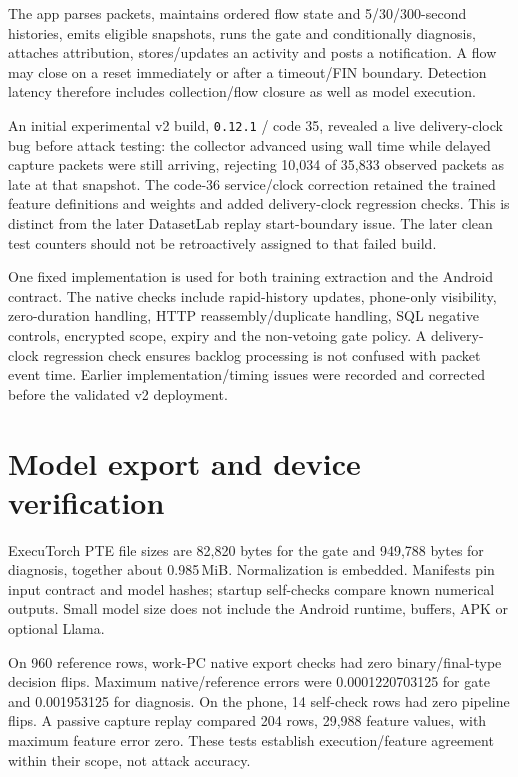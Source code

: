 \documentclass[11pt,a4paper,oneside]{report}
\newcommand{\code}[1]{\nolinkurl{#1}}
\begin{document}
The app parses packets, maintains ordered flow state and 5/30/300-second histories, emits eligible snapshots, runs the gate and conditionally diagnosis, attaches attribution, stores/updates an activity and posts a notification. A flow may close on a reset immediately or after a timeout/FIN boundary. Detection latency therefore includes collection/flow closure as well as model execution.

An initial experimental v2 build, \code{0.12.1} / code 35, revealed a live delivery-clock bug before attack testing: the collector advanced using wall time while delayed capture packets were still arriving, rejecting 10,034 of 35,833 observed packets as late at that snapshot. The code-36 service/clock correction retained the trained feature definitions and weights and added delivery-clock regression checks. This is distinct from the later DatasetLab replay start-boundary issue. The later clean test counters should not be retroactively assigned to that failed build.

One fixed implementation is used for both training extraction and the Android contract. The native checks include rapid-history updates, phone-only visibility, zero-duration handling, HTTP reassembly/duplicate handling, SQL negative controls, encrypted scope, expiry and the non-vetoing gate policy. A delivery-clock regression check ensures backlog processing is not confused with packet event time. Earlier implementation/timing issues were recorded and corrected before the validated v2 deployment.

\section{Model export and device verification}
ExecuTorch PTE file sizes are 82,820 bytes for the gate and 949,788 bytes for diagnosis, together about 0.985\,MiB. Normalization is embedded. Manifests pin input contract and model hashes; startup self-checks compare known numerical outputs. Small model size does not include the Android runtime, buffers, APK or optional Llama.

On 960 reference rows, work-PC native export checks had zero binary/final-type decision flips. Maximum native/reference errors were 0.0001220703125 for gate and 0.001953125 for diagnosis. On the phone, 14 self-check rows had zero pipeline flips. A passive capture replay compared 204 rows, 29,988 feature values, with maximum feature error zero. These tests establish execution/feature agreement within their scope, not attack accuracy.
\end{document}
